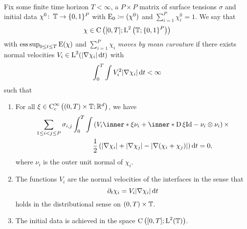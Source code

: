 \begin{definition}
	Fix some finite time horizon $ T < \infty $, a $ P \times P $ matrix of surface tensions $ \sigma $ and initial data $ \chi^{ 0 } \colon \operatorname{\mathbb{T}} \to \{ 0 , 1 \}^{ P } $ with $ \operatorname{E}_{ 0 } \coloneqq ( \chi^{ 0 } ) $ and $ \sum_{ i = 1 }^{ P } \chi_{ i }^{ 0 } = 1 $. We say that
	\begin{equation*}
		\chi \in \operatorname{C} \left(
			[ 0 , T ]
			;
			\operatorname{L}^{ 2 } \left( \operatorname{\mathbb{T}} ; \{ 0 , 1 \}^{ P } \right)
		\right)
	\end{equation*}
	with $ \operatorname*{ess\,sup}_{ 0 \leq t \leq T } \operatorname{E} ( \chi ) $ and $ \sum_{ i = 1 }^{ P } \chi_{ i } $ \emph{moves by mean curvature} if there exists normal velocities $ V_{ i } \in \operatorname{L}^{ 2 } ( \abs{ \nabla \chi_{ i } } \dd{ t } ) $ with
	\begin{equation*}
		\int_{ 0 }^{ T }
			\int
				V_{ i }^{ 2 }
			\abs{ \nabla \chi_{ i } }
		\dd{ t }
		< \infty 
	\end{equation*} 
	such that
	\begin{enumerate}
		\item For all 
		$ \xi \in \operatorname{C}_{ \mathrm{c} }^{ \infty } \left(
			( 0 , T ) \times \operatorname{\mathbb{T}} ; \mathbb{ R }^{ d }
		\right)
		$, we have 
		\begin{align}
			\label{distributional_equation_mmcf}
			\sum_{ 1 \leq i < j \leq P }
				\sigma_{ i , j }
				\int_{ 0 }^{ T }
					\int
						&
						\left(
							V_{ i } \inner*{ \xi }{ \nu_{ i } }
							+
							\inner*{ \diff \xi }{ \mathrm{Id} - \nu_{ i } \otimes \nu_{ i } }
						\right)
						\times
					\\
				\notag
					& \frac{1}{ 2 }
					\left(
						\abs{ \nabla \chi_{ i } }
						+
						\abs{ \nabla \chi_{ j } }
						-
						\abs{ \nabla ( \chi_{ i } + \chi_{ j } ) }
					\right)
				\dd{ t }
			=0,			
		\end{align}
		where $ \nu_{ i } $ is the outer unit normal of $ \chi_{ i } $.
		
		\item 
		The functions $ V_{ i } $ are the normal velocities of the interfaces in the sense that
		\begin{equation*}
			\partial_{ t } \chi_{ i }
			=
			V_{ i } \abs{ \nabla \chi_{ i } } \dd{ t }
		\end{equation*}
		holds in the distributional sense on $ ( 0 , T ) \times \operatorname{\mathbb{T}} $.
		
		\item
		The initial data is achieved in the space $ \operatorname{C} \left( [ 0 , T ] ; \operatorname{L}^{ 2 } ( \operatorname{\mathbb{T}} ) \right) $.
	\end{enumerate}
\end{definition}

